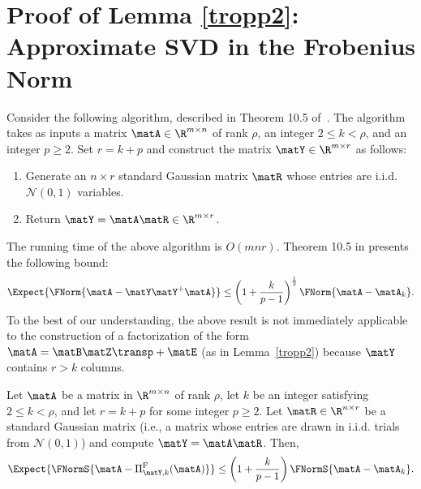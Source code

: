 \section{Proof of Lemma \ref{tropp2}: Approximate SVD in the Frobenius Norm}\label{sec:proofF}
Consider the following algorithm, described in Theorem 10.5 of~\cite{HMT}. The algorithm takes as inputs a matrix $\matA \in \R^{m \times n}$ of rank $\rho$, an integer $2 \leq k < \rho$, and an integer $p \geq 2$. Set $r = k+p$ and construct the matrix
$\matY \in \R^{m \times r}$ as follows:
\begin{enumerate}
\item Generate an $n \times r$ standard Gaussian matrix $\matR$ whose entries are i.i.d. $\mathcal{N}(0,1)$ variables.
\item Return $\matY = \matA \matR \in \R^{m \times r}$.
\end{enumerate}
The running time of the above algorithm is $ O(mnr)$.
Theorem 10.5 in \cite{HMT} presents the following bound:
$$\Expect{\FNorm{\matA - \matY\matY^+\matA }} \leq \left( 1 + \frac{k}{p-1} \right)^{\frac{1}{2}} \FNorm{\matA - \matA_k}.$$
To the best of our understanding, the above result is not immediately applicable to the construction of a factorization of the form $\matA =
\matB \matZ\transp + \matE$ (as in Lemma~\ref{tropp2}) because $\matY$ contains $r > k$ columns.
\begin{lemma}  \label{troppextension}
Let $\matA$ be a matrix in $\R^{m \times n}$ of rank $\rho$, let $k$ be an integer satisfying $2 \leq k < \rho$, and let $r = k+p$ for some integer $p \geq 2$.
Let $\matR \in \R^{n \times r}$ be a standard Gaussian matrix (i.e., a matrix whose entries are drawn in i.i.d. trials from $\mathcal{N}(0,1)$)
and compute $\matY = \matA \matR$. Then,
$$\Expect{\FNormS{\matA - \Pi_{\matY,k}^{\mathrm{F}}(\matA) }} \leq
\left( 1 + \frac{k}{p-1} \right) \FNormS{\matA - \matA_k}.$$
\end{lemma}
